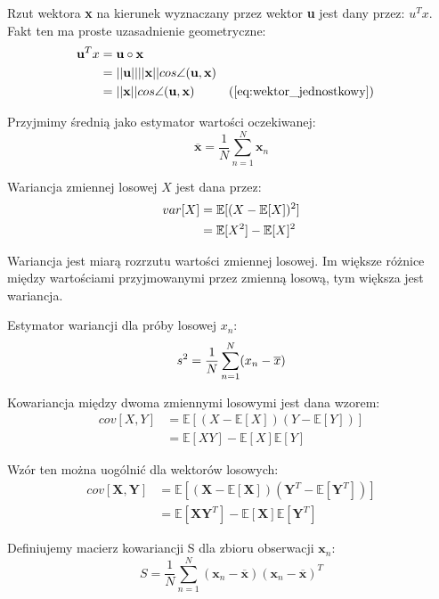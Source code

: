 \documentclass{article}
\newcommand{\bb}{\textbf}
\begin{document}
Rzut wektora \bb{x} na kierunek wyznaczany przez wektor \bb{u} jest dany przez: $u^{T}x$. Fakt ten ma proste uzasadnienie geometryczne:
\begin{align*}	
	\bb{u}^{T}x &= \bb{u} \circ \bb{x} \\
		   & = ||\bb{u}|| ||\bb{x}|| cos \angle (\bb{u}, \bb{x}) \index{1} \\
		   &= ||\bb{x}|| cos \angle (\bb{u}, \bb{x}) \index{1} && \text{(\ref{eq:wektor_jednostkowy})}
\end{align*}

Przyjmimy średnią jako estymator wartości oczekiwanej:
\begin{equation}	\overline{\bb{x}} = \frac{1}{N} \sum_{n=1}^{N} \bb{x}_n \end{equation}

Wariancja zmiennej losowej $X$ jest dana przez:
\begin{align*}	\notag
	var[X]  &= \mathbb{E}[(X - \mathbb{E}[X])^2] \\
			&= \mathbb{E}[X^2] - \mathbb{E}[X]^2
\end{align*}

Wariancja jest miarą rozrzutu wartości zmiennej losowej. Im większe różnice między wartościami przyjmowanymi przez zmienną losową, tym większa jest wariancja.

Estymator wariancji dla próby losowej $x_n$:
\begin{equation}	\notag
	s^2 = \frac{1}{N} \sum_{n=1}^{N}(x_n - \overline{x})
\end{equation}

Kowariancja między dwoma zmiennymi losowymi jest dana wzorem:
\begin{align}	
	cov[X,Y] &= \mathbb{E}[(X - \mathbb{E}[X])(Y - \mathbb{E}[Y])]  \label{eq:cov} \\ 
			 &= \mathbb{E}[XY] - \mathbb{E}[X]\mathbb{E}[Y] \nonumber
\end{align}

Wzór ten można uogólnić dla wektorów losowych:
\begin{align*}
	cov[\textbf{X}, \bb{Y}] &= \mathbb{E}[(\bb{X} - \mathbb{E}[\bb{X}])(\bb{Y}^T - \mathbb{E}[\bb{Y}^T])] \\
							&= \mathbb{E}[\bb{X}\bb{Y}^T] - \mathbb{E}[\bb{X}]\mathbb{E}[\bb{Y}^T]
\end{align*}

Definiujemy macierz kowariancji S dla zbioru obserwacji $\bb{x}_n$:
\begin{equation}
	S = \frac{1}{N} \sum_{n=1}^{N} (\bb{x}_n - \overline{\bb{x}})(\bb{x}_n - \overline{\bb{x}})^T
\end{equation}
\end{document}
